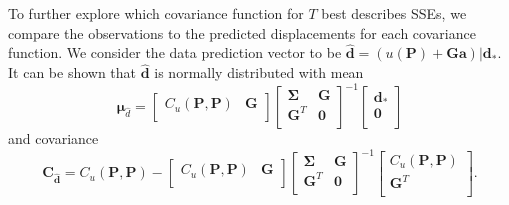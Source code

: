 \documentclass[10pt,letter]{article}
\begin{document}
To further explore which covariance function for $T$ best describes SSEs, we compare the observations to the predicted displacements for each covariance function. We consider the data prediction vector to be $\hat{\bm{d}} = \left(u(\bm{P}) + \bm{G}\bm{a}\right)|\bm{d}_*$. It can be shown that $\hat{\bm{d}}$ is normally distributed with mean 
\begin{equation}\label{eq:DataPredMean}
\bm{\mu}_{\hat{d}} = \left[\begin{array}{cc}
                           C_u(\bm{P},\bm{P}) & \bm{G} \\
                           \end{array}\right]
                     \left[\begin{array}{cc}
                           \bm{\Sigma} & \bm{G} \\
                           \bm{G}^T  & \bm{0} \\
                           \end{array}\right]^{-1}
                     \left[\begin{array}{c}
                           \bm{d}_* \\
                           \bm{0} \\
                           \end{array}\right]
\end{equation}  
and covariance
\begin{equation}\label{eq:DataPredCov}
\bm{C}_{\hat{\bm{d}}} = C_u(\bm{P},\bm{P}) - 
                        \left[\begin{array}{cc}
                              C_u(\bm{P},\bm{P}) & \bm{G} \\
                              \end{array}\right]
                        \left[\begin{array}{cc}
                              \bm{\Sigma} & \bm{G} \\
                              \bm{G}^T  & \bm{0} \\
                              \end{array}\right]^{-1}
                        \left[\begin{array}{c}
                              C_u(\bm{P},\bm{P}) \\
                              \bm{G}^T \\
                              \end{array}\right].
\end{equation}
\end{document}
